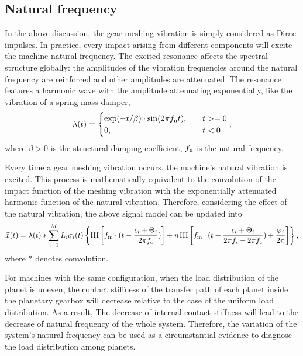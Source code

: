 \documentclass[a4paper,fleqn]{cas-sc}%
\begin{document}
\subsection{Natural frequency}
\par In the above discussion, the gear meshing vibration is simply considered as Dirac impulses. In practice, every impact arising from different components will excite the machine natural frequency. The excited resonance affects the spectral structure globally: the amplitudes of the vibration frequencies around the natural frequency are reinforced and other amplitudes are attenuated. The resonance features a harmonic wave with the amplitude attenuating exponentially, like the vibration of a spring-mass-damper,
\begin{equation}
    \lambda(t)=\begin{cases}
        \exp(-t/\beta)\cdot \sin(2 \pi f_{\rm n} t),\quad & t>=0\\
        0, & t<0
    \end{cases},
\end{equation}
where $\beta>0$ is the structural damping coefficient, $f_{\rm n}$ is the natural frequency.
\par Every time a gear meshing vibration occurs, the machine's natural vibration is excited. This process is mathematically equivalent to the convolution of the impact function of the meshing vibration with the exponentially attenuated harmonic function of the natural vibration. Therefore, considering the effect of the natural vibration, the above signal model can be updated into
\begin{equation}
    \widetilde{x} (t)=\lambda(t) \ast \sum_{i=1}^{M} L_i \sigma_i(t) \left\{ \operatorname{III}\left[f_{\rm m} \cdot (t-\frac{\epsilon_i+\Theta_i}{2 \pi f_{\rm c}})\right]%
    + \eta \operatorname{III}\left[f_{\rm m} \cdot (t + \frac{\epsilon_i+\Theta_i}{2 \pi f_{\rm s}-2 \pi f_{\rm c}}) + \frac{\varphi_i}{2 \pi} \right]%
    \right\},\label{eq:final_signal_model}
\end{equation}
where $\ast$ denotes convolution.
\par For machines with the same configuration, when the load distribution of the planet is uneven, the contact stiffness of the transfer path of each planet inside the planetary gearbox will decrease relative to the case of the uniform load distribution. As a result, The decrease of internal contact stiffness will lead to the decrease of natural frequency of the whole system. Therefore, the variation of the system's natural frequency can be used as a circumstantial evidence to diagnose the load distribution among planets.
\end{document}
